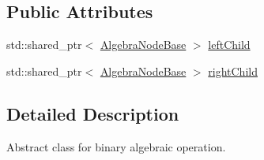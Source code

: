 \subsection*{Public Attributes}
\begin{DoxyCompactItemize}
\item 
std\+::shared\+\_\+ptr$<$ \hyperlink{class_algebra_node_base}{Algebra\+Node\+Base} $>$ \hyperlink{class_binary_algebra_node_base_ab62ff77c5d90bd941b07a6f34e39f14b}{left\+Child}
\item 
std\+::shared\+\_\+ptr$<$ \hyperlink{class_algebra_node_base}{Algebra\+Node\+Base} $>$ \hyperlink{class_binary_algebra_node_base_ac97784ae724c411daca8b17664ce1122}{right\+Child}
\end{DoxyCompactItemize}


\subsection{Detailed Description}
Abstract class for binary algebraic operation. 


